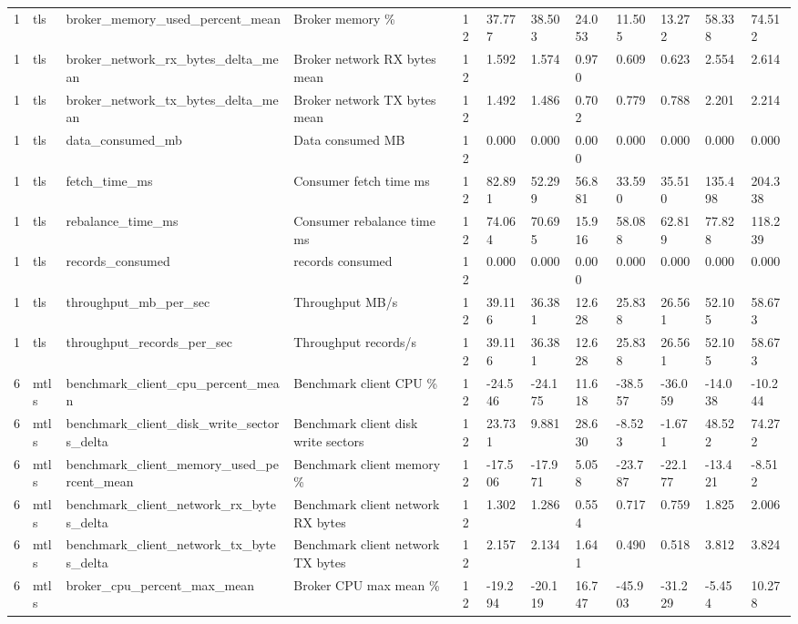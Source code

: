 \begin{longtable}{llllllllllll}
1 & tls & broker\_memory\_used\_percent\_mean & Broker memory \% & 12 & 37.777 & 38.503 & 24.053 & 11.505 & 13.272 & 58.338 & 74.512 \\
1 & tls & broker\_network\_rx\_bytes\_delta\_mean & Broker network RX bytes mean & 12 & 1.592 & 1.574 & 0.970 & 0.609 & 0.623 & 2.554 & 2.614 \\
1 & tls & broker\_network\_tx\_bytes\_delta\_mean & Broker network TX bytes mean & 12 & 1.492 & 1.486 & 0.702 & 0.779 & 0.788 & 2.201 & 2.214 \\
1 & tls & data\_consumed\_mb & Data consumed MB & 12 & 0.000 & 0.000 & 0.000 & 0.000 & 0.000 & 0.000 & 0.000 \\
1 & tls & fetch\_time\_ms & Consumer fetch time ms & 12 & 82.891 & 52.299 & 56.881 & 33.590 & 35.510 & 135.498 & 204.338 \\
1 & tls & rebalance\_time\_ms & Consumer rebalance time ms & 12 & 74.064 & 70.695 & 15.916 & 58.088 & 62.819 & 77.828 & 118.239 \\
1 & tls & records\_consumed & records consumed & 12 & 0.000 & 0.000 & 0.000 & 0.000 & 0.000 & 0.000 & 0.000 \\
1 & tls & throughput\_mb\_per\_sec & Throughput MB/s & 12 & 39.116 & 36.381 & 12.628 & 25.838 & 26.561 & 52.105 & 58.673 \\
1 & tls & throughput\_records\_per\_sec & Throughput records/s & 12 & 39.116 & 36.381 & 12.628 & 25.838 & 26.561 & 52.105 & 58.673 \\
6 & mtls & benchmark\_client\_cpu\_percent\_mean & Benchmark client CPU \% & 12 & -24.546 & -24.175 & 11.618 & -38.557 & -36.059 & -14.038 & -10.244 \\
6 & mtls & benchmark\_client\_disk\_write\_sectors\_delta & Benchmark client disk write sectors & 12 & 23.731 & 9.881 & 28.630 & -8.523 & -1.671 & 48.522 & 74.272 \\
6 & mtls & benchmark\_client\_memory\_used\_percent\_mean & Benchmark client memory \% & 12 & -17.506 & -17.971 & 5.058 & -23.787 & -22.177 & -13.421 & -8.512 \\
6 & mtls & benchmark\_client\_network\_rx\_bytes\_delta & Benchmark client network RX bytes & 12 & 1.302 & 1.286 & 0.554 & 0.717 & 0.759 & 1.825 & 2.006 \\
6 & mtls & benchmark\_client\_network\_tx\_bytes\_delta & Benchmark client network TX bytes & 12 & 2.157 & 2.134 & 1.641 & 0.490 & 0.518 & 3.812 & 3.824 \\
6 & mtls & broker\_cpu\_percent\_max\_mean & Broker CPU max mean \% & 12 & -19.294 & -20.119 & 16.747 & -45.903 & -31.229 & -5.454 & 10.278 \\

\end{longtable}
